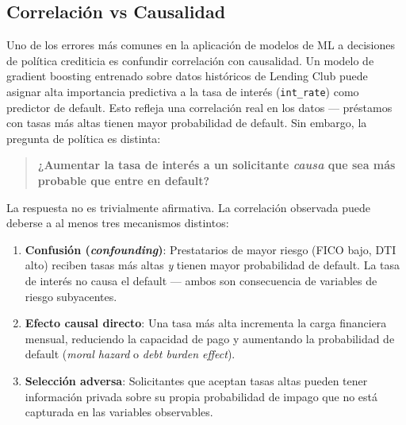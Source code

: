 \documentclass[
  spanish,
  11pt,
  letterpaper,
]{scrbook}
\providecommand{\tightlist}{%
  \setlength{\itemsep}{0pt}\setlength{\parskip}{0pt}}
\theoremstyle{plain}
\theoremstyle{remark}
\begin{document}
\subsection{Correlación vs Causalidad}\label{sec-corr-vs-causal}

Uno de los errores más comunes en la aplicación de modelos de ML a
decisiones de política crediticia es confundir correlación con
causalidad. Un modelo de gradient boosting entrenado sobre datos
históricos de Lending Club puede asignar alta importancia predictiva a
la tasa de interés (\texttt{int\_rate}) como predictor de default. Esto
refleja una correlación real en los datos --- préstamos con tasas más
altas tienen mayor probabilidad de default. Sin embargo, la pregunta de
política es distinta:

\begin{quote}
\textbf{¿Aumentar la tasa de interés a un solicitante \emph{causa} que
sea más probable que entre en default?}
\end{quote}

La respuesta no es trivialmente afirmativa. La correlación observada
puede deberse a al menos tres mecanismos distintos:

\begin{enumerate}
\def\labelenumi{\arabic{enumi}.}
\tightlist
\item
  \textbf{Confusión (\emph{confounding})}: Prestatarios de mayor riesgo
  (FICO bajo, DTI alto) reciben tasas más altas \emph{y} tienen mayor
  probabilidad de default. La tasa de interés no causa el default ---
  ambos son consecuencia de variables de riesgo subyacentes.
\item
  \textbf{Efecto causal directo}: Una tasa más alta incrementa la carga
  financiera mensual, reduciendo la capacidad de pago y aumentando la
  probabilidad de default (\emph{moral hazard} o \emph{debt burden
  effect}).
\item
  \textbf{Selección adversa}: Solicitantes que aceptan tasas altas
  pueden tener información privada sobre su propia probabilidad de
  impago que no está capturada en las variables observables.
\end{enumerate}
\end{document}
